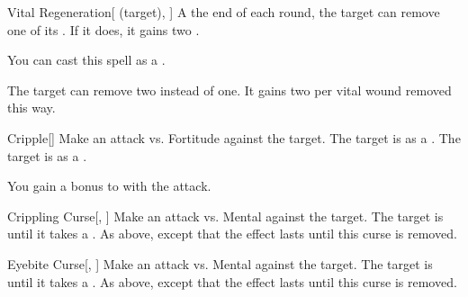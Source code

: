 \lowercase{\hypertarget{spell:Vital Regeneration}{}}\label{spell:Vital Regeneration}
\begin{attuneability}[Rank 5]{\hypertarget{spell:Vital Regeneration}{Vital Regeneration}}[ (target), ]
A the end of each round, the target can remove one of its .
If it does, it gains two .

You can cast this spell as a .

\rankline
{} The target can remove two  instead of one.
It gains two  per vital wound removed this way.

\end{attuneability}
\vspace{0.25em}



\lowercase{\hypertarget{spell:Cripple}{}}\label{spell:Cripple}
\begin{freeability}[Rank 6]{\hypertarget{spell:Cripple}{Cripple}}[]
Make an attack vs. Fortitude against the target.
\hit The target is  as a .
\crit The target is  as a .

\rankline
{} You gain a  bonus to  with the attack.

\end{freeability}
\vspace{0.25em}



\lowercase{\hypertarget{spell:Crippling Curse}{}}\label{spell:Crippling Curse}
\begin{freeability}[Rank 8]{\hypertarget{spell:Crippling Curse}{Crippling Curse}}[, ]
Make an attack vs. Mental against the target.
\hit The target is  until it takes a .
\crit As above, except that the effect lasts until this curse is removed.

\end{freeability}
\vspace{0.25em}



\lowercase{\hypertarget{spell:Eyebite Curse}{}}\label{spell:Eyebite Curse}
\begin{freeability}[Rank 8]{\hypertarget{spell:Eyebite Curse}{Eyebite Curse}}[, ]
Make an attack vs. Mental against the target.
\hit The target is  until it takes a .
\crit As above, except that the effect lasts until this curse is removed.

\end{freeability}
\vspace{0.25em}



